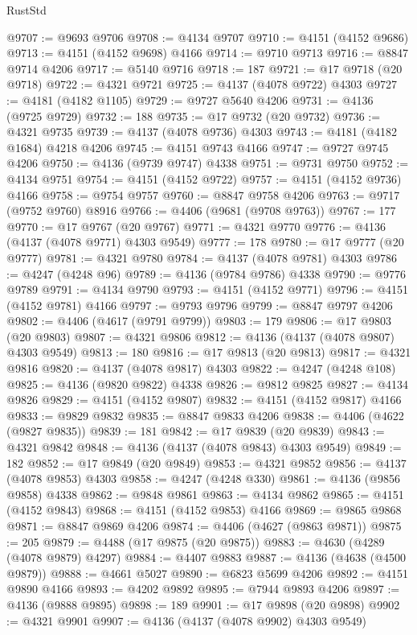 \begin{lexlean}{RustStd}
\begin{coremodule}
@9707 := @9693 @9706
@9708 := @4134 @9707
@9710 := @4151 (@4152 @9686)
@9713 := @4151 (@4152 @9698) @4166
@9714 := @9710 @9713
@9716 := @8847 @9714 @4206
@9717 := @5140 @9716
@9718 := 187
@9721 := @17 @9718 (@20 @9718)
@9722 := @4321 @9721
@9725 := @4137 (@4078 @9722) @4303
@9727 := @4181 (@4182 @1105)
@9729 := @9727 @5640 @4206
@9731 := @4136 (@9725 @9729)
@9732 := 188
@9735 := @17 @9732 (@20 @9732)
@9736 := @4321 @9735
@9739 := @4137 (@4078 @9736) @4303
@9743 := @4181 (@4182 @1684) @4218 @4206
@9745 := @4151 @9743 @4166
@9747 := @9727 @9745 @4206
@9750 := @4136 (@9739 @9747) @4338
@9751 := @9731 @9750
@9752 := @4134 @9751
@9754 := @4151 (@4152 @9722)
@9757 := @4151 (@4152 @9736) @4166
@9758 := @9754 @9757
@9760 := @8847 @9758 @4206
@9763 := @9717 (@9752 @9760) @8916
@9766 := @4406 (@9681 (@9708 @9763))
@9767 := 177
@9770 := @17 @9767 (@20 @9767)
@9771 := @4321 @9770
@9776 := @4136 (@4137 (@4078 @9771) @4303 @9549)
@9777 := 178
@9780 := @17 @9777 (@20 @9777)
@9781 := @4321 @9780
@9784 := @4137 (@4078 @9781) @4303
@9786 := @4247 (@4248 @96)
@9789 := @4136 (@9784 @9786) @4338
@9790 := @9776 @9789
@9791 := @4134 @9790
@9793 := @4151 (@4152 @9771)
@9796 := @4151 (@4152 @9781) @4166
@9797 := @9793 @9796
@9799 := @8847 @9797 @4206
@9802 := @4406 (@4617 (@9791 @9799))
@9803 := 179
@9806 := @17 @9803 (@20 @9803)
@9807 := @4321 @9806
@9812 := @4136 (@4137 (@4078 @9807) @4303 @9549)
@9813 := 180
@9816 := @17 @9813 (@20 @9813)
@9817 := @4321 @9816
@9820 := @4137 (@4078 @9817) @4303
@9822 := @4247 (@4248 @108)
@9825 := @4136 (@9820 @9822) @4338
@9826 := @9812 @9825
@9827 := @4134 @9826
@9829 := @4151 (@4152 @9807)
@9832 := @4151 (@4152 @9817) @4166
@9833 := @9829 @9832
@9835 := @8847 @9833 @4206
@9838 := @4406 (@4622 (@9827 @9835))
@9839 := 181
@9842 := @17 @9839 (@20 @9839)
@9843 := @4321 @9842
@9848 := @4136 (@4137 (@4078 @9843) @4303 @9549)
@9849 := 182
@9852 := @17 @9849 (@20 @9849)
@9853 := @4321 @9852
@9856 := @4137 (@4078 @9853) @4303
@9858 := @4247 (@4248 @330)
@9861 := @4136 (@9856 @9858) @4338
@9862 := @9848 @9861
@9863 := @4134 @9862
@9865 := @4151 (@4152 @9843)
@9868 := @4151 (@4152 @9853) @4166
@9869 := @9865 @9868
@9871 := @8847 @9869 @4206
@9874 := @4406 (@4627 (@9863 @9871))
@9875 := 205
@9879 := @4488 (@17 @9875 (@20 @9875))
@9883 := @4630 (@4289 (@4078 @9879) @4297)
@9884 := @4407 @9883
@9887 := @4136 (@4638 (@4500 @9879))
@9888 := @4661 @5027
@9890 := @6823 @5699 @4206
@9892 := @4151 @9890 @4166
@9893 := @4202 @9892
@9895 := @7944 @9893 @4206
@9897 := @4136 (@9888 @9895)
@9898 := 189
@9901 := @17 @9898 (@20 @9898)
@9902 := @4321 @9901
@9907 := @4136 (@4137 (@4078 @9902) @4303 @9549)

\end{coremodule}
\end{lexlean}
